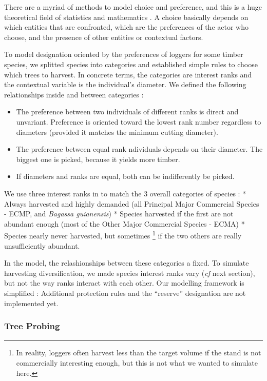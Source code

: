 \documentclass[12pt,]{article}
\providecommand{\tightlist}{%
\setlength{\itemsep}{0pt}\setlength{\parskip}{0pt}}
\theoremstyle{definition}
\theoremstyle{definition}
\theoremstyle{definition}
\theoremstyle{remark}
\begin{document}
There are a myriad of methods to model choice and preference, and this
is a huge theoretical field of statistics and mathematics
\citep{Kaci2011}. A choice basically depends on which entities that are
confronted, which are the preferences of the actor who choose, and the
presence of other entities or contextual factors.

To model designation oriented by the preferences of loggers for some
timber species, we splitted species into categories and established
simple rules to choose which trees to harvest. In concrete terms, the
categories are interest ranks and the contextual variable is the
individual's diameter. We defined the following relationships inside and
between categories :

\begin{itemize}
\tightlist
\item
  The preference between two individuals of different ranks is direct
  and unvariant. Preference is oriented toward the lowest rank number
  regardless to diameters (provided it matches the minimum cutting
  diameter).
\item
  The preference between equal rank ndividuals depends on their
  diameter. The biggest one is picked, because it yields more timber.
\item
  If diameters and ranks are equal, both can be indifferently be picked.
\end{itemize}

We use three interest ranks in to match the 3 overall categories of
species : * Always harvested and highly demanded (all Principal Major
Commercial Species - ECMP, and \emph{Bagassa guianensis}) * Species
harvested if the first are not abundant enough (most of the Other Major
Commercial Species - ECMA) * Species nearly never harvested, but
sometimes \footnote{In reality, loggers often harvest less than the
  target volume if the stand is not commercially interesting enough, but
  this is not what we wanted to simulate here.} if the two others are
really unsufficiently abundant.

In the model, the relashionships between these categories a fixed. To
simulate harvesting diversification, we made species interest ranks vary
(\emph{cf} next section), but not the way ranks interact with each
other. Our modelling framework is simplified : Additional protection
rules and the ``reserve'' designation are not implemented yet.

\subsubsection{Tree Probing}\label{tree-probing}
\end{document}
